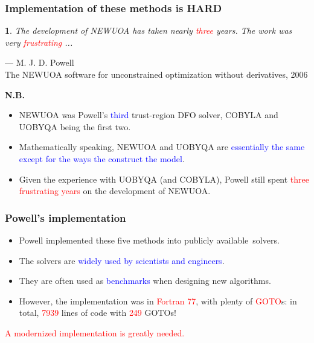\documentclass[slidestop,mathserif,xcolor=dvipsnames]{beamer}
\newcommand{\blue}[1]{\textcolor{blue}{#1}}
\newcommand{\red}[1]{\textcolor{red}{#1}}
\newtheorem*{mybox}{}
\newcommand{\nb}{\textbf{N.B.}}
\begin{document}
\begin{frame}
    \frametitle{Implementation of these methods is HARD}
    \vspace{3ex}
    \begin{mybox}
    \textnormal{The development of NEWUOA has taken nearly \red{three} years. The work
    was very \red{frustrating} ...
}
\end{mybox}
    \begin{flushright}
        --- {M. J. D. Powell}
    \vspace{0.3ex}
    \\\small{The NEWUOA software for unconstrained optimization without derivatives, 2006}
    \end{flushright}

    \nb
    \begin{itemize}
        \item NEWUOA was Powell's \blue{third} trust-region DFO solver, COBYLA and UOBYQA being the first two.
    \vspace{0.3ex}
\item Mathematically speaking, NEWUOA and UOBYQA are \blue{essentially the same except for the
    ways the construct the model}.
    \vspace{0.3ex}
\item Given the experience with UOBYQA (and COBYLA), Powell still spent \red{three frustrating
        years} on the development of NEWUOA.
    \end{itemize}
\end{frame}


\begin{frame}
    \frametitle{Powell's implementation}

            \vspace{2ex}
    \begin{itemize}
        \item Powell implemented these five methods into publicly available~solvers.%
    \vspace{1ex}
\item The solvers are \blue{widely used by scientists and engineers}.
    \vspace{1ex}
\item They are often used as \blue{benchmarks} when designing new algorithms.
    \vspace{1ex}
        \item However, the implementation was in \red{Fortran 77}, with plenty of \red{GOTO}s:
            in total,  \red{7939} lines of code with \red{249} GOTOs!
    \end{itemize}

    \begin{center}
    \red{A modernized implementation is greatly needed.}
    \end{center}
\end{frame}
\end{document}
